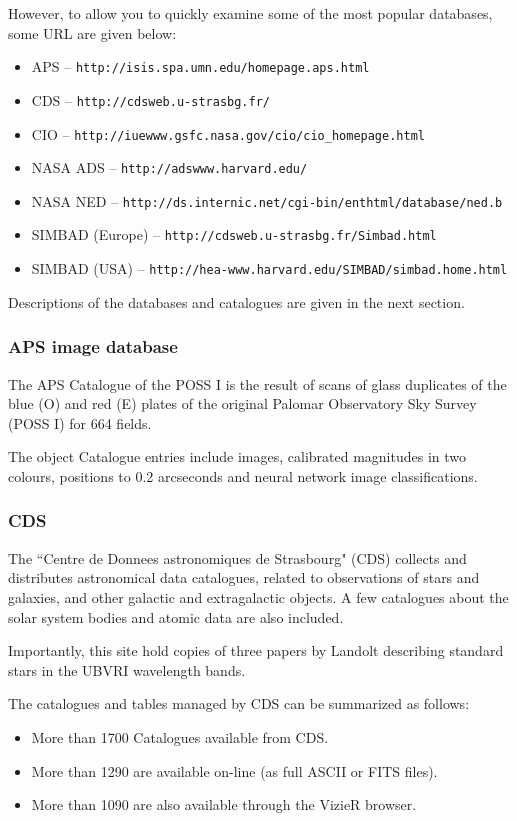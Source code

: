 \documentclass[twoside,11pt]{article}
\newcommand{\htmladdnormallink}[2]{#1}
\newcommand{\xlabel}[1]{}
\newcommand{\HTTPPref}{\htmladdnormallink{\tt http://isis.spa.umn.edu/homepage.aps.html}{http://isis.spa.umn.edu/homepage.aps.html}}
\newcommand{\HTTPQref}{\htmladdnormallink{\tt http://cdsweb.u-strasbg.fr/}{http://cdsweb.u-strasbg.fr/}}
\newcommand{\HTTPRref}{\htmladdnormallink{\tt http://iuewww.gsfc.nasa.gov/cio/cio\_{}homepage.html}{http://iuewww.gsfc.nasa.gov/cio/cio\_{}homepage.html}}
\newcommand{\HTTPSref}{\htmladdnormallink{\tt http://adswww.harvard.edu/}{http://adswww.harvard.edu/}}
\newcommand{\HTTPTref}{\htmladdnormallink{\tt http://ds.internic.net/cgi-bin/enthtml/database/ned.b}{http://ds.internic.net/cgi-bin/enthtml/database/ned.b}}
\newcommand{\HTTPUref}{\htmladdnormallink{\tt http://cdsweb.u-strasbg.fr/Simbad.html}{http://cdsweb.u-strasbg.fr/Simbad.html}}
\newcommand{\HTTPVref}{\htmladdnormallink{\tt http://hea-www.harvard.edu/SIMBAD/simbad.home.html}{http://hea-www.harvard.edu/SIMBAD/simbad.home.html}}
\begin{document}
However, to allow you to quickly examine some of the most popular databases, some
URL are given below:

\begin{itemize}
\item APS -- {\HTTPPref}
\item CDS -- {\HTTPQref}
\item CIO -- {\HTTPRref}
\item NASA ADS -- {\HTTPSref}
\item NASA NED -- {\HTTPTref}
\item SIMBAD (Europe) -- {\HTTPUref}
\item SIMBAD (USA) -- {\HTTPVref}
\end{itemize}

Descriptions of the databases and catalogues are given in the next section.

\subsubsection{APS image database} \xlabel{APS}
\label{sec:aps}

The APS Catalogue of the POSS I is the result of scans of glass duplicates of
the blue (O) and red (E) plates of the original Palomar Observatory Sky
Survey (POSS I) for 664 fields.

The object Catalogue entries include images, calibrated magnitudes in two
colours, positions to 0.2 arcseconds and neural network image
classifications.

\subsubsection{CDS} \xlabel{CDS}
\label{sec:cds}

The ``Centre de Donnees astronomiques de Strasbourg" (CDS) collects and distributes
astronomical data catalogues, related to observations of stars and galaxies,
and other galactic and extragalactic objects. A few catalogues about the
solar system bodies and atomic data are also included.

Importantly, this site hold copies of three papers by Landolt describing standard
stars in the UBVRI wavelength bands.

The catalogues and tables managed by CDS can be summarized as follows:

\begin{itemize}
\item  More than 1700 Catalogues available from CDS.
\item  More than 1290 are available on-line (as full ASCII or FITS files).
\item  More than 1090 are also available through the VizieR browser.
\end{itemize}
\end{document}

